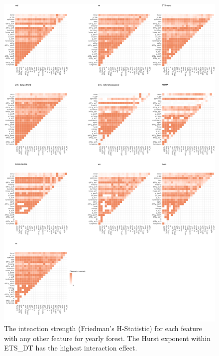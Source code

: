 \documentclass[11pt,a4paper,]{article}
\begin{document}
\begin{figure}
\centering
\includegraphics{figures/friedmany-1.pdf}
\caption{\label{fig:friedmany}The inteaction strength (Friedman's H-Statistic) for each feature with any other feature for yearly forest. The Hurst exponent within ETS\_DT has the highest interaction effect.}
\end{figure}
\end{document}
